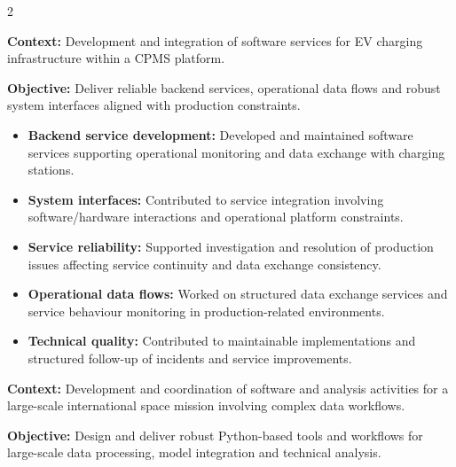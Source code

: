 \documentclass[8pt,a4paper,ragged2e,withhyper]{../_shared/altacv}
\begin{document}
\begin{paracol}{2}


\textbf{Context:} Development and integration of software services for EV charging infrastructure within a CPMS platform.

\textbf{Objective:} Deliver reliable backend services, operational data flows and robust system interfaces aligned with production constraints.

\begin{itemize}
\item \textbf{Backend service development:} Developed and maintained software services supporting operational monitoring and data exchange with charging stations.
\item \textbf{System interfaces:} Contributed to service integration involving software/hardware interactions and operational platform constraints.
\item \textbf{Service reliability:} Supported investigation and resolution of production issues affecting service continuity and data exchange consistency.
\item \textbf{Operational data flows:} Worked on structured data exchange services and service behaviour monitoring in production-related environments.
\item \textbf{Technical quality:} Contributed to maintainable implementations and structured follow-up of incidents and service improvements.
\end{itemize}

\divider


\textbf{Context:} Development and coordination of software and analysis activities for a large-scale international space mission involving complex data workflows.

\textbf{Objective:} Design and deliver robust Python-based tools and workflows for large-scale data processing, model integration and technical analysis.


\end{paracol}
\end{document}
